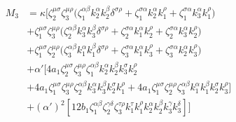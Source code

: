 \begin{equation}\begin{split}
{M_3}&= \kappa \Big[
\zeta_2^{\mu\sigma}\zeta_3^{\mu\rho}
\big(\zeta_1^{\alpha\beta}k_2^{\alpha}k_2^{\beta}\delta^{\sigma\rho}
+\zeta_1^{\sigma\alpha}k_2^{\alpha}k_1^{\rho}
+\zeta_1^{\sigma\alpha}k_3^{\alpha}k_1^{\rho}\big)\\&
+\zeta_1^{\mu\sigma}\zeta_3^{\mu\rho}
\big(\zeta_2^{\alpha\beta}k_3^{\alpha}k_3^{\beta}\delta^{\sigma\rho}
+\zeta_2^{\sigma\alpha}k_1^{\alpha}k_2^{\rho}
+\zeta_2^{\sigma\alpha}k_3^{\alpha}k_2^{\rho}\big)\\&
+\zeta_1^{\mu\sigma}\zeta_2^{\mu\rho}
\big(\zeta_3^{\alpha\beta}k_1^{\alpha}k_1^{\beta}\delta^{\sigma\rho}
+\zeta_3^{\sigma\alpha}k_1^{\alpha}k_3^{\rho}
+\zeta_3^{\sigma\alpha}k_2^{\alpha}k_3^{\rho}\big)\\&
+\alpha'[4a_1\zeta_2^{\mu\sigma}\zeta_3^{\mu\rho}\zeta_1^{\alpha\beta}k_2^\alpha k_2^\beta k_3^\sigma k_2^\rho\\&
+4a_1\zeta_1^{\mu\sigma}\zeta_3^{\mu\rho}\zeta_2^{\alpha\beta}k_3^\alpha k_3^\beta k_2^\sigma k_1^\rho
+4a_1\zeta_1^{\mu\sigma}\zeta_2^{\mu\rho}\zeta_3^{\alpha\beta}k_1^\alpha k_1^\beta k_2^\sigma k_3^\rho]
\\&+(\alpha')^2[12b_1\zeta_1^{\alpha\beta}\zeta_2^{\gamma\delta}\zeta_3^{\tau\rho}k_1^\tau k_1^\rho
k_2^\alpha k_2^\beta k_3^\gamma k_3^\delta]
\Big]
\end{split}\end{equation}

